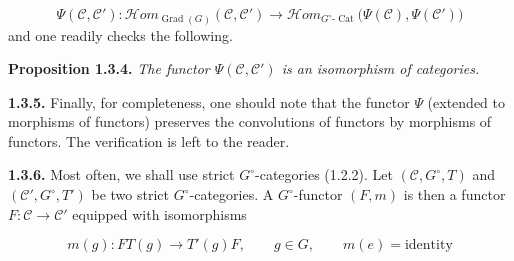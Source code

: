 \begin{equation}
  \Psi(\mathcal C,\mathcal C')\colon
  \mathcal{H}\!om_{\operatorname{Grad}(G)}(\mathcal C,\mathcal C')
  \longrightarrow
  \mathcal{H}\!om_{G^\circ\text{-}\operatorname{Cat}}
    \bigl(\Psi(\mathcal C),\Psi(\mathcal C')\bigr)
  \tag{1.3.3.3}
\end{equation}
and one readily checks the following.

\noindent\textbf{Proposition 1.3.4.}\quad
\emph{The functor $\Psi(\mathcal C,\mathcal C')$ is an isomorphism of
categories.}

\noindent\textbf{1.3.5.}\quad
Finally, for completeness, one should note that the functor $\Psi$
(extended to morphisms of functors) preserves the convolutions of
functors by morphisms of functors. The verification is left to the
reader.

\noindent\textbf{1.3.6.}\quad
Most often, we shall use strict $G^\circ$-categories (1.2.2). Let
$(\mathcal C,G^\circ,T)$ and $(\mathcal C',G^\circ,T')$ be two strict
$G^\circ$-categories. A $G^\circ$-functor $(F,m)$ is then a functor
$F\colon\mathcal C\to\mathcal C'$ equipped with isomorphisms

\begin{equation}
  m(g)\colon FT(g)\longrightarrow T'(g)F,
  \qquad g\in G,
  \qquad m(e)=\text{identity}
  \tag{1.3.6.1}
\end{equation}
